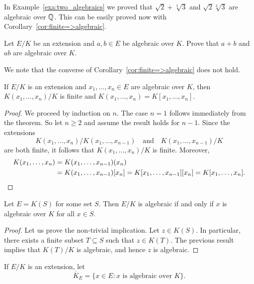 In Example~\ref{exa:two_algebraics} we 
proved that $\sqrt{2}+\sqrt[3]{3}$ and $\sqrt{2}\sqrt[3]{3}$ 
are algebraic over $\mathbb{Q}$. This can be easily proved
now with Corollary~\ref{cor:finite=>algebraic}. 

\begin{exercise}
\label{xca:algebraic}
    Let $E/K$ be an extension and 
    $a,b\in E$ be algebraic over $K$. Prove 
    that $a+b$ and $ab$ are algebraic over $K$. 
\end{exercise}

We note that the converse of Corollary~\ref{cor:finite=>algebraic} does not hold. 

\begin{corollary}
\label{cor:finite type finite}
	If $E/K$ is an extension and $x_1,\dots,x_n\in E$ 
	are algebraic over $K$, then 
	$K(x_1,\dots,x_n)/K$ is finite and
	$K(x_1,\dots,x_n)=K[x_1,\dots,x_n]$. 
\end{corollary}

\begin{proof}
	We proceed by induction on $n$. The case $n=1$ follows immediately from 
	the theorem. So let $n\geq2$ and assume the result holds for $n-1$. Since the extensions 
	\[
    K(x_1,\dots,x_n)/K(x_1,\dots,x_{n-1})\quad\text{and}\quad 
    K(x_1,\dots,x_{n-1})/K
    \]
    are
	both finite, it follows that $K(x_1,\dots,x_n)/K$ is finite. Moreover, 
	\begin{align*}
	K(x_1,\dots,x_n)&=K(x_1,\dots,x_{n-1})(x_n)\\
	&=K(x_1,\dots,x_{n-1})[x_n]=K[x_1,\dots,x_{n-1}][x_n]=K[x_1,\dots,x_n].\qedhere
    \end{align*}
\end{proof}

\begin{corollary}
\label{cor:finite type algebraic}
	Let $E=K(S)$ for some set $S$. Then $E/K$ is algebraic if and only if
	$x$ is algebraic over $K$ for all $x\in S$. 
\end{corollary}

\begin{proof}
	Let us prove the non-trivial implication. Let $z\in K(S)$. In particular, 
	there exists a finite subset $T\subseteq S$ such that 
	$z\in K(T)$. The previous result implies that $K(T)/K$ is algebraic, and
	hence $z$ is algebraic. 
\end{proof}

If $E/K$ is an extension, let 
\[
	\overline{K}_E=\{x\in E:x\text{ is algebraic over }K\}. 
\]

